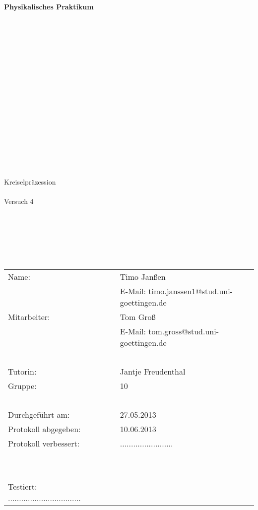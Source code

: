 \thispagestyle{empty}
\begin{center}
    {\Huge{\textbf{Physikalisches Praktikum}}}\\[16pt]
\ \\
\ \\
\ \\
\ \\
\ \\
\ \\
\ \\
\ \\
\ \\
\ \\
\ \\
\ \\
\ \\
\ \\
\ \\
\ \\
\ \\
\huge{Kreiselpräzession}
\ \\
\ \\
\large{Versuch 4}
\end{center}

\normalsize
\ \\
\ \\
\ \\
\ \\
\ \\

\begin{center}
\begin{tabular}{lcl}
      Name: & ~ & Timo Janßen \\
                    & ~ & E-Mail: timo.janssen1@stud.uni-goettingen.de \\
	  Mitarbeiter: & ~ & Tom Groß \\
		    & ~ & E-Mail: tom.gross@stud.uni-goettingen.de \\
\ \\		    
      Tutorin: & ~ & Jantje Freudenthal \\
      Gruppe: & ~ & 10 \\
\ \\      
      Durchgeführt am: & ~ & 27.05.2013 \\
      Protokoll abgegeben: & ~ & 10.06.2013 \\
      Protokoll verbessert: & ~ & ........................\\
\ \\
\ \\
      Testiert: .................................    
\end{tabular}\\
\end{center}
